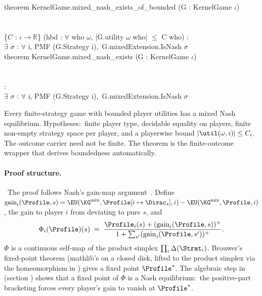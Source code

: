\begin{leanbox}
theorem KernelGame.mixed\_nash\_exists\_of\_bounded (G : KernelGame $\iota$)\\
\\
\\
\bd \{$C$ : $\iota \to \mathbb{R}$\} (hbd : $\forall$ who $\omega$, |G.utility $\omega$ who| $\le$ C who) :\\
\bd $\exists$ $\sigma$ : $\forall$ i, PMF (G.Strategy i),\ G.mixedExtension.IsNash $\sigma$\\[3pt]
theorem KernelGame.mixed\_nash\_exists (G : KernelGame $\iota$)\\
\\
\\
 :\\
\bd $\exists$ $\sigma$ : $\forall$ i, PMF (G.Strategy i),\ G.mixedExtension.IsNash $\sigma$
\end{leanbox}

\Mathematical
Every finite-strategy game with bounded player utilities has a
mixed Nash equilibrium.  Hypotheses:\ finite player type,
decidable equality on players, finite non-empty strategy space per
player, and a playerwise bound $|\util(\omega,i)| \le C_i$.
The outcome carrier need not be finite.  The theorem
 is the finite-outcome wrapper that derives
boundedness automatically.

\paragraph{Proof structure.}\
The proof follows Nash's gain-map argument~\citep{Nash1951}.
Define
$\mathrm{gain}_i(\Profile, s) = \EU(\KG^{\mathrm{mix}}, \Profile[i \mapsto \Dirac_s], i) - \EU(\KG^{\mathrm{mix}}, \Profile, i)$,
the gain to player $i$ from deviating to pure $s$, and
\[
  \Phi_i(\Profile)(s) \;=\;
    \frac{\Profile_i(s) + (\mathrm{gain}_i(\Profile, s))^+}
         {1 + \sum_{s'} (\mathrm{gain}_i(\Profile, s'))^+}.
\]
$\Phi$ is a continuous self-map of the product simplex
$\prod_i \Delta(\Strat_i)$.  Brouwer's fixed-point theorem (mathlib's
\TT{brouwerFixedPoint} on a closed disk, lifted to the product
simplex via the homeomorphism in
) gives a fixed point
$\Profile^*$.  The algebraic step in
 (section
) shows that a fixed point of $\Phi$ is a Nash
equilibrium:\ the positive-part bracketing forces every player's
gain to vanish at $\Profile^*$.

